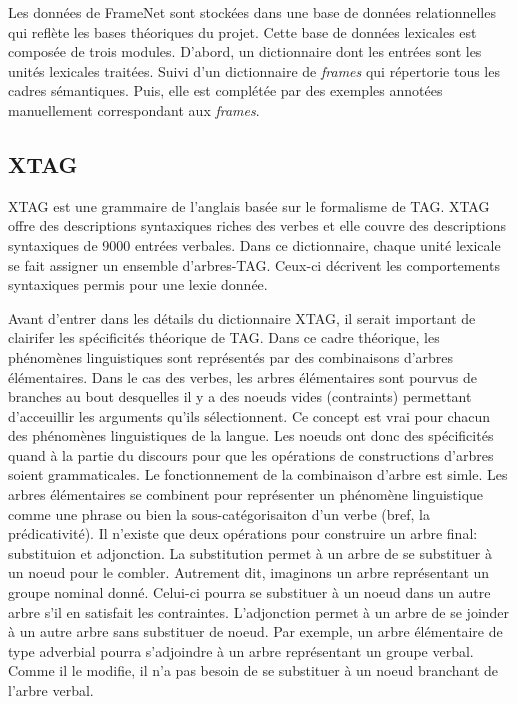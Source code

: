 Les données de FrameNet sont stockées dans une base de données relationnelles qui reflète les bases théoriques du projet. Cette base de données lexicales est composée de trois modules. D'abord, un dictionnaire dont les entrées sont les unités lexicales traitées. Suivi d'un dictionnaire de \emph{frames} qui répertorie tous les cadres sémantiques. Puis, elle est complétée par des exemples annotées manuellement correspondant aux \emph{frames}.

\subsection{XTAG}

XTAG \citep{ResearchGroupLexicalizedTreeAdjoining2001} est une grammaire de l'anglais basée sur le formalisme de \acf{TAG}. XTAG offre des descriptions syntaxiques riches des verbes et elle couvre des descriptions syntaxiques de 9000 entrées verbales.  Dans ce dictionnaire, chaque unité lexicale se fait assigner un ensemble d'arbres-TAG. Ceux-ci décrivent les comportements syntaxiques permis pour une lexie donnée.

Avant d'entrer dans les détails du dictionnaire XTAG, il serait important de clairifer les spécificités théorique de \ac{TAG}. Dans ce cadre théorique, les phénomènes linguistiques sont représentés par des combinaisons d'arbres élémentaires. Dans le cas des verbes, les arbres élémentaires sont pourvus de branches au bout desquelles il y a des noeuds vides (contraints) permettant d'acceuillir les arguments qu'ils sélectionnent. Ce concept est vrai pour chacun des phénomènes linguistiques de la langue. Les noeuds ont donc des spécificités quand à la partie du discours pour que les opérations de constructions d'arbres soient grammaticales. Le fonctionnement de la combinaison d'arbre est simle. Les arbres élémentaires se combinent pour représenter un phénomène linguistique comme une phrase ou bien la sous-catégorisaiton d'un verbe (bref, la prédicativité). Il n'existe que deux opérations pour construire un arbre final: substituion et adjonction. La substitution permet à un arbre de se substituer à un noeud pour le combler. Autrement dit, imaginons un arbre représentant un groupe nominal donné. Celui-ci pourra se substituer à un noeud dans un autre arbre s'il en satisfait les contraintes. L'adjonction permet à un arbre de se joinder à un autre arbre sans substituer de noeud. Par exemple, un arbre élémentaire de type adverbial pourra s'adjoindre à un arbre représentant un groupe verbal. Comme il le modifie, il n'a pas besoin de se substituer à un noeud branchant de l'arbre verbal.


